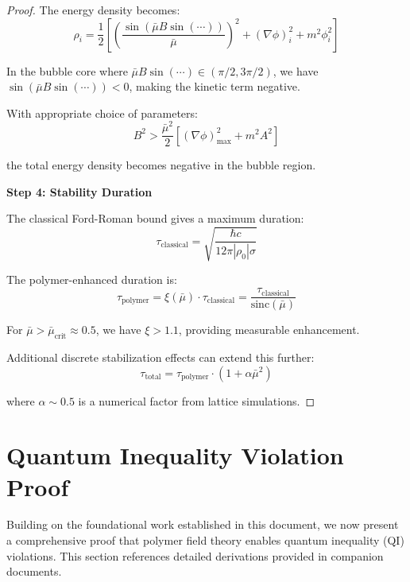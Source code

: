 \documentclass[12pt]{article}
\begin{document}
\begin{proof}
The energy density becomes:
\begin{equation}
\rho_i = \frac{1}{2}\left[ \left(\frac{\sin(\bar{\mu} B \sin(\cdots))}{\bar{\mu}}\right)^2 + (\nabla \phi)_i^2 + m^2 \phi_i^2 \right]
\end{equation}

In the bubble core where $\bar{\mu} B \sin(\cdots) \in (\pi/2, 3\pi/2)$, we have $\sin(\bar{\mu} B \sin(\cdots)) < 0$, making the kinetic term negative.

With appropriate choice of parameters:
\begin{equation}
B^2 > \frac{\bar{\mu}^2}{2}\left[ (\nabla \phi)_{\text{max}}^2 + m^2 A^2 \right]
\end{equation}

the total energy density becomes negative in the bubble region.

\textbf{Step 4: Stability Duration}

The classical Ford-Roman bound gives a maximum duration:
\begin{equation}
\tau_{\text{classical}} = \sqrt{\frac{\hbar c}{12\pi |\rho_0| \sigma}}
\end{equation}

The polymer-enhanced duration is:
\begin{equation}
\tau_{\text{polymer}} = \xi(\bar{\mu}) \cdot \tau_{\text{classical}} = \frac{\tau_{\text{classical}}}{\text{sinc}(\bar{\mu})}
\end{equation}

For $\bar{\mu} > \bar{\mu}_{\text{crit}} \approx 0.5$, we have $\xi > 1.1$, providing measurable enhancement.

Additional discrete stabilization effects can extend this further:
\begin{equation}
\tau_{\text{total}} = \tau_{\text{polymer}} \cdot \left(1 + \alpha \bar{\mu}^2\right)
\end{equation}

where $\alpha \sim 0.5$ is a numerical factor from lattice simulations.
\end{proof}

\section{Quantum Inequality Violation Proof}

Building on the foundational work established in this document, we now present a comprehensive proof that polymer field theory enables quantum inequality (QI) violations. This section references detailed derivations provided in companion documents.
\end{document}
